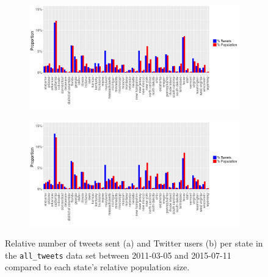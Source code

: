 \documentclass[11pt, a4paper,twoside]{report}\usepackage[]{graphicx}\usepackage[]{color}
\begin{document}
\begin{figure}[H]
\centering
\begin{subfigure}[t]{1\textwidth}
  \includegraphics[width=1\linewidth]{activity_total_state_Twitter_full_aggregated.png}
  \caption{}
  \label{fig:tweets_state_full}
  \end{subfigure}
  
  \begin{subfigure}[t]{1\textwidth}
  \includegraphics[width=1\linewidth]{activity_total_user_state_Twitter_full_aggregated.png}
  \caption{}
    \label{fig:tweets_state_full_user}
  \end{subfigure}
\caption{Relative number of tweets sent (a) and Twitter users (b) per state in the \texttt{all\_tweets} data set between 2011-03-05 and 2015-07-11 compared to each state's relative population size.}
\end{figure}
\end{document}
